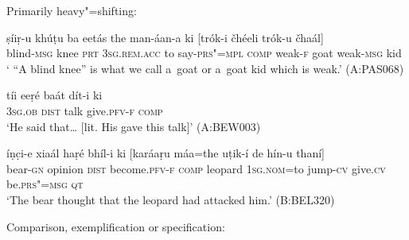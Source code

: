 \clearpage
{} Primarily heavy"=shifting:

\begin{exe}
\ex
\label{ex:13-228}
\gll ṣíiṛ-u khúṭu ba eetás the  man-áan-a ki [trók-i čhéeli trók-u čhaál] \\
blind-\textsc{msg} knee \textsc{prt} \textsc{3sg.rem.acc} to say-\textsc{prs"=mpl} \textsc{comp} weak-\textsc{f} goat weak-\textsc{msg} kid \\
\glt ` ``A blind knee'' is what we call a~goat or a~goat kid which is weak.' (A:PAS068)

\ex
\label{ex:13-229}
\gll tíi eeṛé baát dít-i ki  \\
\textsc{3sg.ob} \textsc{dist} talk give.\textsc{pfv-f} \textsc{comp}  \\
\glt `He said that{\ldots} [lit. His gave this talk]' (A:BEW003)

\ex
\label{ex:13-230}
\gll íṇc̣i-e xiaál haṛé bhíl-i  ki [karáaṛu máa=the uṭik-í de hín-u thaní] \\
bear-\textsc{gn} opinion \textsc{dist} become.\textsc{pfv-f} \textsc{comp} leopard \textsc{1sg.nom=}to jump-\textsc{cv} give.\textsc{cv} be.\textsc{prs"=msg} \textsc{qt} \\
\glt `The bear thought that the leopard had attacked him.' (B:BEL320) 
\end{exe}

 Comparison, exemplification or specification:

